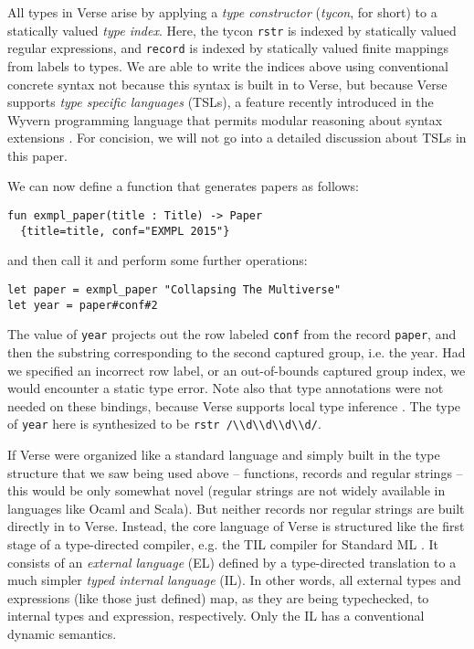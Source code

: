 \documentclass[preprint]{sigplanconf}
\newcommand{\Verse}{{\textsf{\small Verse}}}
\newcommand{\liv}[1]{\lstinline{#1}}
\begin{document}
All types in {\Verse} arise by applying a \emph{type constructor} (\emph{tycon}, for short) to a statically valued \emph{type index}. Here, the tycon \liv{rstr} is indexed by statically valued regular expressions, and \liv{record} is indexed by statically valued finite mappings from labels to types. We are able to write the indices above using conventional concrete syntax not because this syntax is built in to {\Verse}, but because {\Verse} supports \emph{type specific languages} (TSLs), a feature recently introduced in the Wyvern programming language that permits modular reasoning about syntax extensions \cite{TSLs}. For concision, we will not go into a detailed discussion about TSLs in this paper.



We can now define a function that generates papers as follows:
\begin{lstlisting}
fun exmpl_paper(title : Title) -> Paper
  {title=title, conf="EXMPL 2015"}
\end{lstlisting}
and then call it and perform some further operations:
\begin{lstlisting}
let paper = exmpl_paper "Collapsing The Multiverse"
let year = paper#conf#2
\end{lstlisting}
The value of \liv{year} projects out the row labeled \liv{conf} from the record \liv{paper}, and then the substring corresponding to the second captured group, i.e. the year. Had we specified an incorrect row label, or an out-of-bounds captured group index, we would encounter a static type error. Note also that type annotations were not needed on these bindings, because {\Verse} supports local type inference \cite{Pierce:2000:LTI:345099.345100}. The type of \liv{year} here is synthesized to be \liv{rstr /\\d\\d\\d\\d/}.

If {\Verse} were organized like a standard language and simply built in the type structure that we saw being used above -- functions, records and regular strings -- this would be only somewhat novel (regular strings are not widely available in languages like Ocaml and Scala). But neither records nor regular strings are built directly in to {\Verse}. Instead, the core language of {\Verse} is structured like the first stage of a type-directed compiler, e.g. the TIL compiler for Standard ML \cite{tarditi+:til-OLD}. It consists of an \emph{external language} (EL) defined by a type-directed translation to a much simpler \emph{typed internal language} (IL). In other words, all external types and expressions (like those just defined) map, as they are being typechecked, to internal types and expression, respectively. Only the IL has a conventional dynamic semantics.
\end{document}
